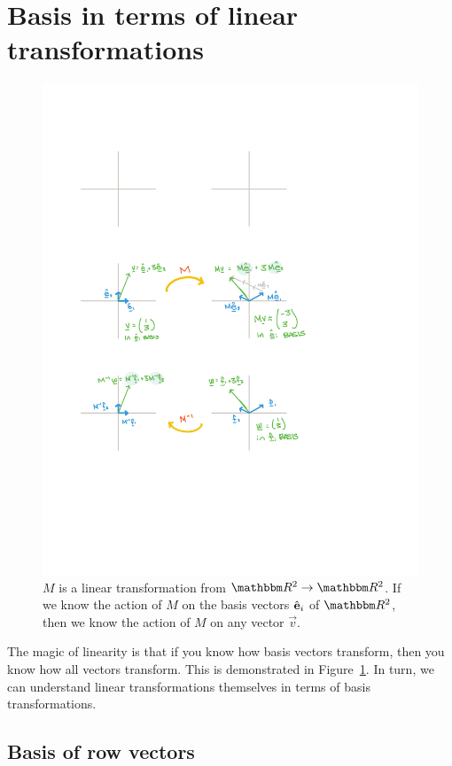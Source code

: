 

\section{Basis in terms of linear transformations}

\begin{figure}[tb]
    \centering
    \includegraphics[width=.8\textwidth]{figures/maps_M.pdf}
    \caption{$M$ is a linear transformation from $\RR ^2\to\RR ^2$. If we know the action of $M$ on the basis vectors $\hat{\mathbf{e}}_i$ of $\RR ^2$, then we know the action of $M$ on any vector $\vec{v}$.}
    \label{fig:map:M}
\end{figure}

The magic of linearity is that if you know how basis vectors transform, then you know how all vectors transform. This is demonstrated in Figure~\ref{fig:map:M}. In turn, we can understand linear transformations themselves in terms of basis transformations.

\subsection{Basis of row vectors}

